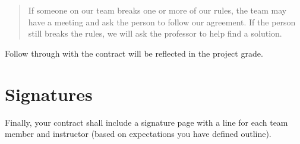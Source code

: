 \documentclass{article}\usepackage[]{graphicx}\usepackage[]{color}
\begin{document}
\begin{quote}
If someone on our team breaks one or more of our rules, the team may have a meeting and ask the person to follow our agreement. If the person still breaks the rules, we will ask the professor to help ﬁnd a solution.
\end{quote}

Follow through with the contract will be reflected in the project grade.

\section{Signatures}

Finally, your contract shall include a signature page with a line for each team member and instructor (based on expectations you have defined outline).
\end{document}
